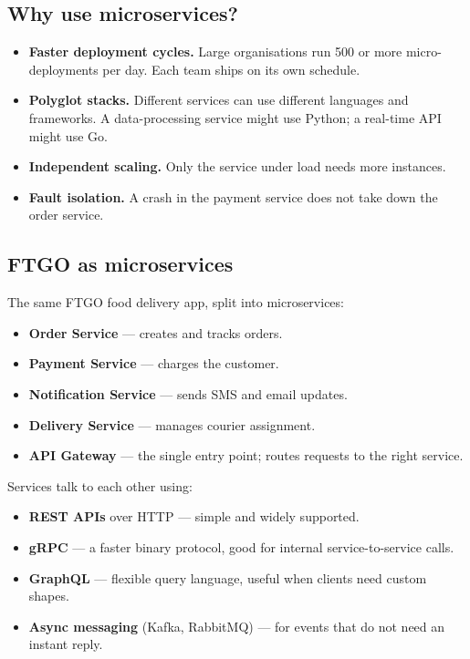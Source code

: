 \documentclass[a4paper,11pt]{article}
\begin{document}
\subsection{Why use microservices?}

\begin{itemize}
  \item \textbf{Faster deployment cycles.}
    Large organisations run 500 or more micro-deployments per day.
    Each team ships on its own schedule.
  \item \textbf{Polyglot stacks.}
    Different services can use different languages and frameworks.
    A data-processing service might use Python; a real-time API might use Go.
  \item \textbf{Independent scaling.}
    Only the service under load needs more instances.
  \item \textbf{Fault isolation.}
    A crash in the payment service does not take down the order service.
\end{itemize}

\subsection{FTGO as microservices}

The same FTGO food delivery app, split into microservices:

\begin{itemize}
  \item \textbf{Order Service} --- creates and tracks orders.
  \item \textbf{Payment Service} --- charges the customer.
  \item \textbf{Notification Service} --- sends SMS and email updates.
  \item \textbf{Delivery Service} --- manages courier assignment.
  \item \textbf{API Gateway} --- the single entry point; routes requests to the right service.
\end{itemize}

Services talk to each other using:
\begin{itemize}
  \item \textbf{REST APIs} over HTTP --- simple and widely supported.
  \item \textbf{gRPC} --- a faster binary protocol, good for internal service-to-service calls.
  \item \textbf{GraphQL} --- flexible query language, useful when clients need custom shapes.
  \item \textbf{Async messaging} (Kafka, RabbitMQ) --- for events that do not need
    an instant reply.
\end{itemize}
\end{document}

